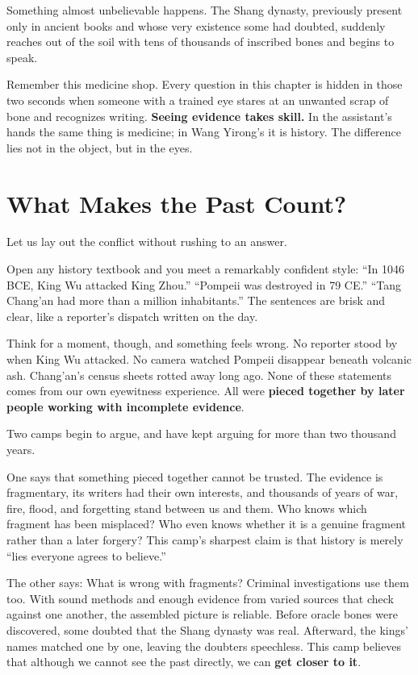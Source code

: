 Something almost unbelievable happens. The Shang dynasty, previously present only in ancient books and whose very existence some had doubted, suddenly reaches out of the soil with tens of thousands of inscribed bones and begins to speak.

Remember this medicine shop. Every question in this chapter is hidden in those two seconds when someone with a trained eye stares at an unwanted scrap of bone and recognizes writing. \textbf{Seeing evidence takes skill.} In the assistant's hands the same thing is medicine; in Wang Yirong's it is history. The difference lies not in the object, but in the eyes.

\section{What Makes the Past Count?}
Let us lay out the conflict without rushing to an answer.

Open any history textbook and you meet a remarkably confident style: ``In 1046 BCE, King Wu attacked King Zhou.'' ``Pompeii was destroyed in 79 CE.'' ``Tang Chang'an had more than a million inhabitants.'' The sentences are brisk and clear, like a reporter's dispatch written on the day.

Think for a moment, though, and something feels wrong. No reporter stood by when King Wu attacked. No camera watched Pompeii disappear beneath volcanic ash. Chang'an's census sheets rotted away long ago. None of these statements comes from our own eyewitness experience. All were \textbf{pieced together by later people working with incomplete evidence}.

Two camps begin to argue, and have kept arguing for more than two thousand years.

One says that something pieced together cannot be trusted. The evidence is fragmentary, its writers had their own interests, and thousands of years of war, fire, flood, and forgetting stand between us and them. Who knows which fragment has been misplaced? Who even knows whether it is a genuine fragment rather than a later forgery? This camp's sharpest claim is that history is merely ``lies everyone agrees to believe.''

The other says: What is wrong with fragments? Criminal investigations use them too. With sound methods and enough evidence from varied sources that check against one another, the assembled picture is reliable. Before oracle bones were discovered, some doubted that the Shang dynasty was real. Afterward, the kings' names matched one by one, leaving the doubters speechless. This camp believes that although we cannot see the past directly, we can \textbf{get closer to it}.

